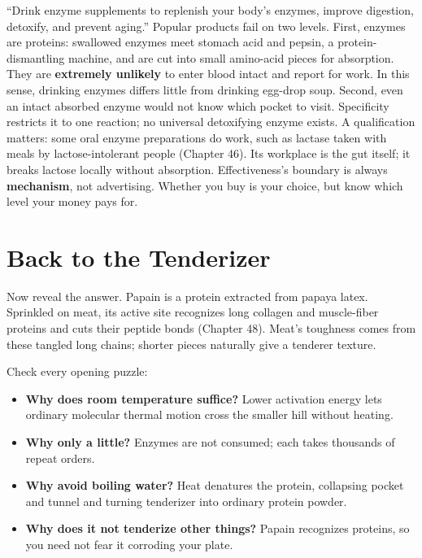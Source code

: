 \begin{wuqu}
``Drink enzyme supplements to replenish your body's enzymes, improve digestion, detoxify, and prevent aging.'' Popular products fail on two levels. First, enzymes are proteins: swallowed enzymes meet stomach acid and pepsin, a protein-dismantling machine, and are cut into small amino-acid pieces for absorption. They are \textbf{extremely unlikely} to enter blood intact and report for work. In this sense, drinking enzymes differs little from drinking egg-drop soup. Second, even an intact absorbed enzyme would not know which pocket to visit. Specificity restricts it to one reaction; no universal detoxifying enzyme exists. A qualification matters: some oral enzyme preparations do work, such as lactase taken with meals by lactose-intolerant people (Chapter 46). Its workplace is the gut itself; it breaks lactose locally without absorption. Effectiveness's boundary is always \textbf{mechanism}, not advertising. Whether you buy is your choice, but know which level your money pays for.
\end{wuqu}

\section{Back to the Tenderizer}

Now reveal the answer. Papain is a protein extracted from papaya latex. Sprinkled on meat, its active site recognizes long collagen and muscle-fiber proteins and cuts their peptide bonds (Chapter 48). Meat's toughness comes from these tangled long chains; shorter pieces naturally give a tenderer texture.

Check every opening puzzle:

\begin{itemize}[itemsep=2pt]
\item \textbf{Why does room temperature suffice?} Lower activation energy lets ordinary molecular thermal motion cross the smaller hill without heating.
\item \textbf{Why only a little?} Enzymes are not consumed; each takes thousands of repeat orders.
\item \textbf{Why avoid boiling water?} Heat denatures the protein, collapsing pocket and tunnel and turning tenderizer into ordinary protein powder.
\item \textbf{Why does it not tenderize other things?} Papain recognizes proteins, so you need not fear it corroding your plate.
\end{itemize}

